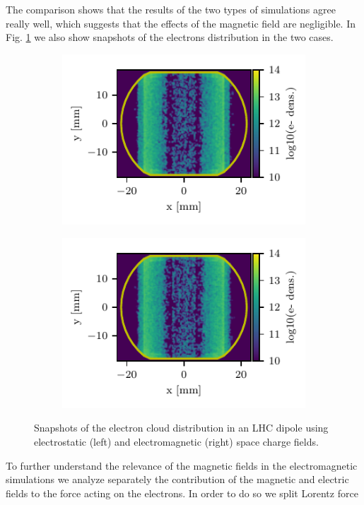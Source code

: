 The comparison shows that the results of the two types of simulations agree really well, which suggests that the effects of the magnetic field are negligible. In Fig. \ref{fig:es_vs_em_snap} we also show snapshots of the electrons distribution in the two cases.
\begin{figure}
    \centering
    \begin{subfigure}{0.47\textwidth}
        \hspace*{-2cm}
        \includegraphics[scale=1.4]{chapters/Chapter1/Figures/es_dipole_snap.pdf}
    \end{subfigure}
    \hfill
    \begin{subfigure}{0.47\textwidth}
        \includegraphics[scale=1.4]{chapters/Chapter1/Figures/em_dipole_snap.pdf}
    \end{subfigure}
    \caption{Snapshots of the electron cloud distribution in an LHC dipole using electrostatic (left) and electromagnetic (right) space charge fields.}
    \label{fig:es_vs_em_snap}
\end{figure}
To further understand the relevance of the magnetic fields in the electromagnetic simulations we analyze separately the contribution of the magnetic and electric fields to the force acting on the electrons. In order to do so we split Lorentz force

